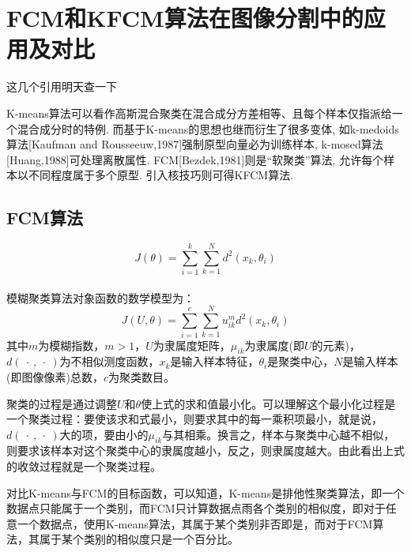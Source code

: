\documentclass[lang=cn,11pt]{elegantpaper}
\begin{document}
\section{FCM和KFCM算法在图像分割中的应用及对比}
\Huge 这几个引用明天查一下

\normalsize
K-means算法可以看作高斯混合聚类在混合成分方差相等、且每个样本仅指派给一个混合成分时的特例. 而基于K-means的思想也继而衍生了很多变体, 如k-medoids算法[Kaufman and Rousseeuw,1987]强制原型向量必为训练样本, k-mosed算法[Huang,1988]可处理离散属性. FCM[Bezdek,1981]则是“软聚类”算法, 允许每个样本以不同程度属于多个原型. 引入核技巧则可得KFCM算法. 
\subsection{FCM算法}
\begin{equation*}
J(\theta)=\sum_{i=1}^k\sum_{k=1}^N d^2(x_k,\theta_i)
\end{equation*}
\\ 模糊聚类算法对象函数的数学模型为：
\begin{equation*}
	J(U,\theta)=\sum_{i=1}^c\sum_{k=1}^Nu_{ik}^m d^2(x_k,\theta_i)
\end{equation*}
其中$m$为模糊指数，$m>1$，$U$为隶属度矩阵，$\mu_{ik}$为隶属度(即$U$的元素)，
\ $d(\ \cdot \ , \ \cdot \ )$为不相似测度函数，$x_k$是输入样本特征，$\theta_i$是聚类中心，$N$是输入样本(即图像像素)总数，$c$为聚类数目。
\par 聚类的过程是通过调整$U$和$\theta$使上式的求和值最小化。可以理解这个最小化过程是一个聚类过程：要使该求和式最小，则要求其中的每一乘积项最小，就是说，$d(\ \cdot \ , \ \cdot \ )$大的项，要由小的$\mu_{ik}$与其相乘。换言之，样本与聚类中心越不相似，则要求该样本对这个聚类中心的隶属度越小，反之，则隶属度越大。由此看出上式的收敛过程就是一个聚类过程。
\par 对比K-means与FCM的目标函数，可以知道，K-means是排他性聚类算法，即一个数据点只能属于一个类别，而FCM只计算数据点雨各个类别的相似度，即对于任意一个数据点，使用K-means算法，其属于某个类别非否即是，而对于FCM算法，其属于某个类别的相似度只是一个百分比。





\newpage
\nocite{*}



\end{document}
